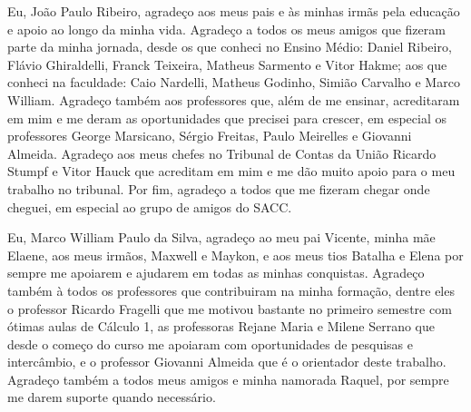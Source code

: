 \begin{agradecimentos}
Eu, João Paulo Ribeiro, agradeço aos meus pais e às minhas irmãs pela educação e apoio ao longo da minha vida. Agradeço a todos os meus amigos que fizeram parte da minha jornada, desde os que conheci no Ensino Médio: Daniel Ribeiro, Flávio Ghiraldelli, Franck Teixeira, Matheus Sarmento e Vitor Hakme; aos que conheci na faculdade: Caio Nardelli, Matheus Godinho, Simião Carvalho e Marco William. Agradeço também aos professores que, além de me ensinar, acreditaram em mim e me deram as oportunidades que precisei para crescer, em especial os professores George Marsicano, Sérgio Freitas, Paulo Meirelles e Giovanni Almeida. Agradeço aos meus chefes no Tribunal de Contas da União Ricardo Stumpf e Vitor Hauck que acreditam em mim e me dão muito apoio para o meu trabalho no tribunal. Por fim, agradeço a todos que me fizeram chegar onde cheguei, em especial ao grupo de amigos do SACC.

Eu, Marco William Paulo da Silva, agradeço ao meu pai Vicente, minha mãe Elaene, aos meus irmãos, Maxwell e Maykon, e aos meus tios Batalha e Elena por sempre me apoiarem e ajudarem em todas as minhas conquistas. Agradeço também à todos os professores que contribuiram na minha formação, dentre eles o professor Ricardo Fragelli que me motivou bastante no primeiro semestre com ótimas aulas de Cálculo 1, as professoras Rejane Maria e Milene Serrano que desde o começo do curso me apoiaram com oportunidades de pesquisas e intercâmbio, e o professor Giovanni Almeida que é o orientador deste trabalho. Agradeço também a todos meus amigos e minha namorada Raquel, por sempre me darem suporte quando necessário.
\end{agradecimentos}
